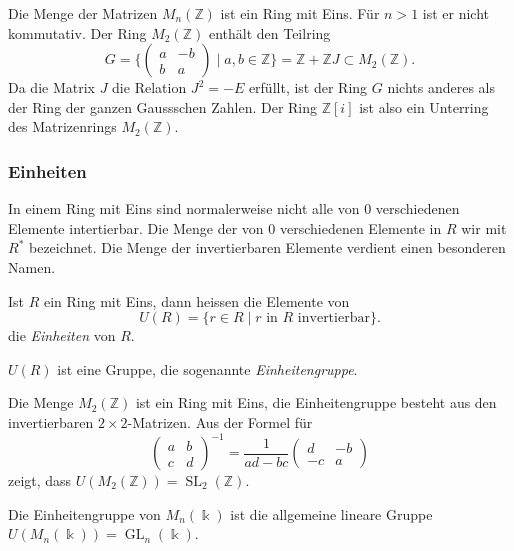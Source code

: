 \begin{beispiel}
Die Menge der Matrizen $M_n(\mathbb{Z})$ ist ein Ring mit Eins.
Für $n>1$ ist er nicht kommutativ.
Der Ring $M_2(\mathbb{Z})$ enthält den Teilring
\[
G
=
\biggl\{
\begin{pmatrix}
a&-b\\b&a
\end{pmatrix}
\;\bigg|\;
a,b\in\mathbb{Z}
\biggr\}
=
\mathbb{Z}+ \mathbb{Z}J
\subset
M_2(\mathbb{Z}).
\]
Da die Matrix $J$ die Relation $J^2=-E$ erfüllt, ist der Ring $G$
nichts anderes als der Ring der ganzen Gaussschen Zahlen.
Der Ring $\mathbb{Z}[i]$ ist also ein Unterring des Matrizenrings
$M_2(\mathbb{Z})$.
\end{beispiel}

\subsubsection{Einheiten}
In einem Ring mit Eins sind normalerweise nicht alle von $0$ verschiedenen
Elemente intertierbar.
Die Menge der von $0$ verschiedenen Elemente in $R$ wir mit $R^*$
bezeichnet.
%
Die Menge der invertierbaren Elemente verdient einen besonderen Namen.

\begin{definition}
Ist $R$ ein Ring mit Eins, dann heissen die Elemente von
\[
U(R) = \{ r\in R \;|\; \text{$r$ in $R$ invertierbar}\}.
\]
die {\em Einheiten} von $R$.
%
\end{definition}

\begin{satz}
$U(R)$ ist eine Gruppe, die sogenannte {\em Einheitengruppe}.
%
\end{satz}

\begin{beispiel}
Die Menge $M_2(\mathbb{Z})$ ist ein Ring mit Eins, die Einheitengruppe
besteht aus den invertierbaren $2\times 2$-Matrizen. 
Aus der Formel für 
\[
\begin{pmatrix}
a&b\\
c&d
\end{pmatrix}^{-1}
=
\frac{1}{ad-bc}\begin{pmatrix}
d&-b\\
-c&a
\end{pmatrix}
\]
zeigt, dass $U(M_2(\mathbb{Z})) = \operatorname{SL}_2(\mathbb{Z})$.
\end{beispiel}

\begin{beispiel}
Die Einheitengruppe von $M_n(\Bbbk)$ ist die allgemeine lineare Gruppe 
$U(M_n(\Bbbk))=\operatorname{GL}_n(\Bbbk)$.
\end{beispiel}

